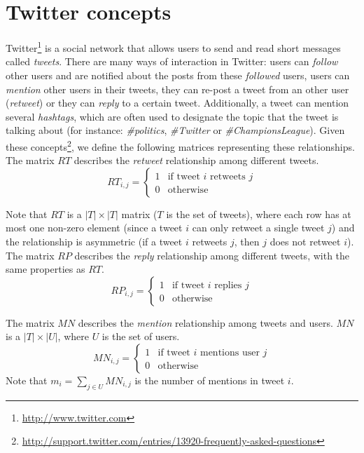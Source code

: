 \section{Twitter concepts}
Twitter\footnote{\url{http://www.twitter.com}} is a social network that allows users to send and read short messages called \emph{tweets}. There are many ways of interaction in Twitter: users can \emph{follow} other users and are notified about the posts from these \emph{followed} users, users can \emph{mention} other users in their tweets, they can re-post a tweet from an other user (\emph{retweet}) or they can \emph{reply} to a certain tweet. Additionally, a tweet can mention several \emph{hashtags}, which are often used to designate the topic that the tweet is talking about (for instance: \emph{\#politics}, \emph{\#Twitter} or \emph{\#ChampionsLeague}). Given these concepts\footnote{\url{http://support.twitter.com/entries/13920-frequently-asked-questions}}, we define the following matrices representing these relationships. \\

The matrix $RT$ describes the \emph{retweet} relationship among different tweets. 
\begin{equation}\label{eq:retweet_rel}
RT_{i,j} = \begin{cases}
1 & \text{if tweet } i \text{ retweets } j \\
0 & \text{otherwise}
\end{cases}
\end{equation}

Note that $RT$ is a $|T| \times |T|$ matrix ($T$ is the set of tweets), where each row has at most one non-zero element (since a tweet $i$ can only retweet a single tweet $j$) and the relationship is asymmetric (if a tweet $i$ retweets $j$, then $j$ does not retweet $i$). \\

The matrix $RP$ describes the \emph{reply} relationship among different tweets, with the same properties as $RT$.
\begin{equation}\label{eq:reply_rel}
RP_{i,j} = \begin{cases}
1 & \text{if tweet } i \text{ replies } j \\
0 & \text{otherwise}
\end{cases}
\end{equation}

The matrix $MN$ describes the \emph{mention} relationship among tweets and users. $MN$ is a $|T| \times |U|$, where $U$ is the set of users. 
\begin{equation}\label{eq:mention_rel}
MN_{i,j} = \begin{cases}
1 & \text{if tweet } i \text{ mentions user } j \\
0 & \text{otherwise}
\end{cases}
\end{equation}
Note that $m_i = \sum_{j \in U} MN_{i,j}$ is the number of mentions in tweet $i$. \\

